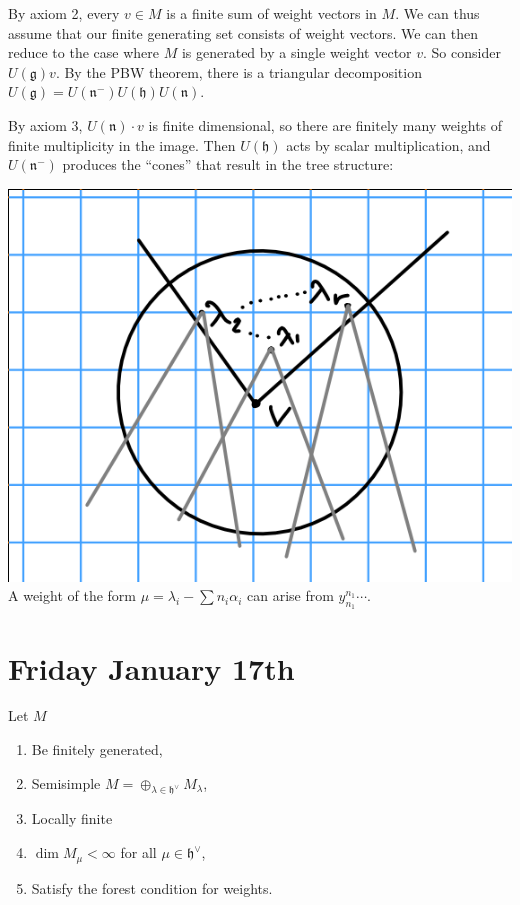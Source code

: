 \documentclass[11pt]{scrartcl}
\theoremstyle{definition}
\theoremstyle{theorem}
\theoremstyle{proof}
\newenvironment{proof}
{\pushQED{$\qed$}\pf}
{\par\popQED\endpf}
\theoremstyle{definition}
\theoremstyle{break}
\theoremstyle{problem}
\providecommand{\tightlist}{%
  \setlength{\itemsep}{0pt}\setlength{\parskip}{0pt}}
\newcommand{\dual}[0]{^\vee}
\newcommand{\lieg}[0]{{\mathfrak{g}}}
\newcommand{\lieh}[0]{{\mathfrak{h}}}
\newcommand{\lien}[0]{{\mathfrak{n}}}
\renewcommand{\qed}[0]{\hfill\blacksquare}
\begin{document}
\begin{proof}

By axiom 2, every \(v\in M\) is a finite sum of weight vectors in \(M\).
We can thus assume that our finite generating set consists of weight
vectors. We can then reduce to the case where \(M\) is generated by a
single weight vector \(v\). So consider \(U(\lieg) v\). By the PBW
theorem, there is a triangular decomposition
\(U(\lieg) = U(\lien^-) U(\lieh) U(\lien)\).

\hfill\break

By axiom 3, \(U(\lien) \cdot v\) is finite dimensional, so there are
finitely many weights of finite multiplicity in the image. Then
\(U(\lieh)\) acts by scalar multiplication, and \(U(\lien^-)\) produces
the ``cones'' that result in the tree structure:

\includegraphics{figures/2020-01-15-09:57.png}\\

A weight of the form \(\mu = \lambda_i - \sum n_i \alpha_i\) can arise
from \(y_{n_1}^{n_1} \cdots\).\end{proof}

\hypertarget{friday-january-17th}{%
\section{Friday January 17th}\label{friday-january-17th}}

Let \(M\)

\begin{enumerate}
\def\labelenumi{\arabic{enumi}.}
\tightlist
\item
  Be finitely generated,
\item
  Semisimple \(M = \oplus_{\lambda \in \lieh\dual} M_\lambda\),
\item
  Locally finite
\item
  \(\dim M_\mu < \infty\) for all \(\mu \in \lieh\dual\),
\item
  Satisfy the forest condition for weights.
\end{enumerate}
\end{document}
